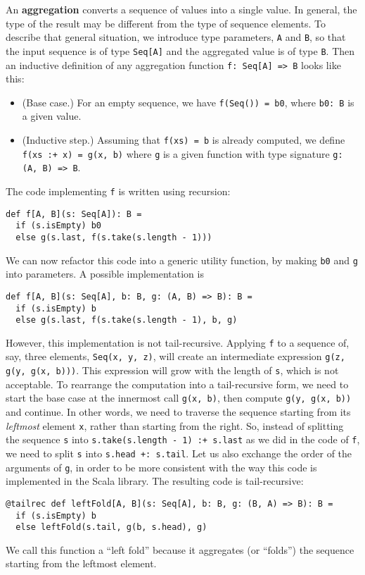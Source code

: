An \textbf{aggregation} converts a sequence of
values into a single value. In general, the type of the result may
be different from the type of sequence elements. To describe that
general situation, we introduce type parameters, \lstinline!A! and
\lstinline!B!, so that the input sequence is of type \lstinline!Seq[A]!
and the aggregated value is of type \lstinline!B!. Then an inductive
definition of any aggregation function \lstinline!f: Seq[A] => B!
looks like this:
\begin{itemize}
\item (Base case.) For an empty sequence, we have \lstinline!f(Seq()) = b0!,
where \lstinline!b0: B! is a given value.
\item (Inductive step.) Assuming that \lstinline!f(xs) = b! is already
computed, we define \lstinline!f(xs :+ x) = g(x, b)! where \lstinline!g!
is a given function with type signature \lstinline!g: (A, B) => B!.
\end{itemize}
The code implementing \lstinline!f! is written using recursion:
\begin{lstlisting}
def f[A, B](s: Seq[A]): B =
  if (s.isEmpty) b0
  else g(s.last, f(s.take(s.length - 1)))
\end{lstlisting}
We can now refactor this code into a generic utility function, by
making \lstinline!b0! and \lstinline!g! into parameters. A possible
implementation is
\begin{lstlisting}
def f[A, B](s: Seq[A], b: B, g: (A, B) => B): B =
  if (s.isEmpty) b
  else g(s.last, f(s.take(s.length - 1), b, g)
\end{lstlisting}
However, this implementation is not tail-recursive. Applying \lstinline!f!
to a sequence of, say, three elements, \lstinline!Seq(x, y, z)!,
will create an intermediate expression \lstinline!g(z, g(y, g(x, b)))!.
This expression will grow with the length of \lstinline!s!, which
is not acceptable. To rearrange the computation into a tail-recursive
form, we need to start the base case at the innermost call \lstinline!g(x, b)!,
then compute \lstinline!g(y, g(x, b))! and continue. In other words,
we need to traverse the sequence starting from its \emph{leftmost}
element \lstinline!x!, rather than starting from the right. So, instead
of splitting the sequence \lstinline!s! into \lstinline!s.take(s.length - 1) :+ s.last!
as we did in the code of \lstinline!f!, we need to split \lstinline!s!
into \lstinline!s.head +: s.tail!. Let us also exchange the order
of the arguments of \lstinline!g!, in order to be more consistent
with the way this code is implemented in the Scala library. The resulting
code is tail-recursive:
\begin{lstlisting}
@tailrec def leftFold[A, B](s: Seq[A], b: B, g: (B, A) => B): B =
  if (s.isEmpty) b
  else leftFold(s.tail, g(b, s.head), g)
\end{lstlisting}
We call this function a \textsf{``}left fold\textsf{''} because it aggregates (or
\textsf{``}folds\textsf{''}) the sequence starting from the leftmost element.

